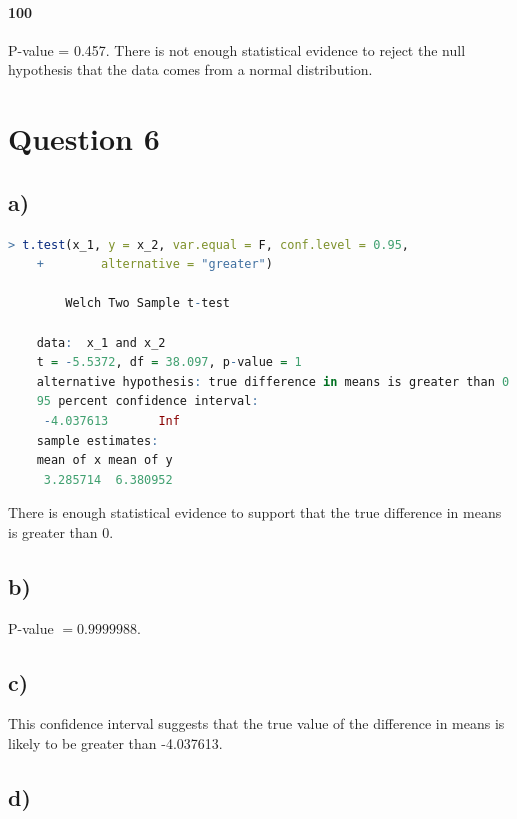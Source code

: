 \documentclass{article}
\begin{document}
\paragraph{100} P-value = 0.457. There is not enough statistical evidence to reject the null hypothesis that the data comes from a normal distribution.

\clearpage
\section*{Question 6}

\subsection*{a)}
\begin{lstlisting}[language=R, caption=Calculating the P-value for a $t_0$ value, basicstyle=\small]
    > t.test(x_1, y = x_2, var.equal = F, conf.level = 0.95,
    +        alternative = "greater")
    
        Welch Two Sample t-test
    
    data:  x_1 and x_2
    t = -5.5372, df = 38.097, p-value = 1
    alternative hypothesis: true difference in means is greater than 0
    95 percent confidence interval:
     -4.037613       Inf
    sample estimates:
    mean of x mean of y 
     3.285714  6.380952 
    \end{lstlisting}
    There is enough statistical evidence to support that the true difference in means is greater than 0.
\subsection*{b)}
P-value $= 0.9999988$.
\subsection*{c)}
This confidence interval suggests that the true value of the difference
in means is likely to be greater than -4.037613.
\clearpage
\subsection*{d)}
\end{document}
